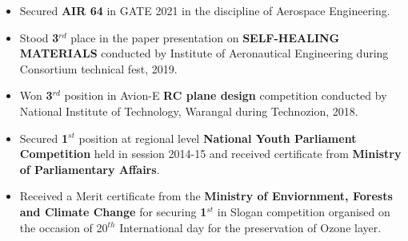 \documentclass[10pt,article]{article}
\newcommand{\resheading}[1]{{\noindent \large \colorbox{mygrey} { \begin{minipage}{0.99\textwidth}\centering{\textbf{#1 \vphantom{p\^{E}}}}\end{minipage}}}}
\begin{document}
\vspace{2mm}
\resheading{ACHIEVEMENTS}
\begin{itemize}
\setlength\itemsep{-0.3em}
\item Secured \textbf{AIR 64} in GATE 2021 in the discipline of Aerospace Engineering.
\item Stood \textbf{3$^{rd}$} place in the paper presentation on \textbf{SELF-HEALING MATERIALS} conducted by Institute of Aeronautical Engineering during Consortium technical fest, 2019.
\item Won \textbf{3$^{rd}$} position in Avion-E \textbf{RC plane design} competition conducted by National Institute of Technology, Warangal during Technozion, 2018.
\item Secured \textbf{1$^{st}$} position at regional level \textbf{National Youth Parliament Competition} held in session 2014-15 and received certificate from \textbf{Ministry of Parliamentary Affairs}.
\item Received a Merit certificate from the \textbf{Ministry of Enviornment, Forests and Climate Change} for securing \textbf{1$^{st}$} in Slogan competition organised on the occasion of 20$^{th}$ International day for the preservation of Ozone layer.
\end{itemize}
\end{document}
